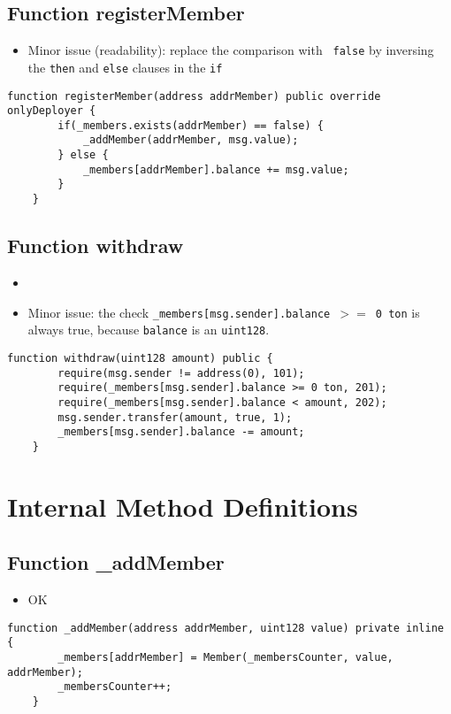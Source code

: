 \subsection{Function registerMember}

\begin{itemize}
\item Minor issue (readability): replace the comparison with {\tt
  false} by inversing the {\tt then} and {\tt else} clauses in the
  {\tt if}
\end{itemize}

\begin{lstlisting}[firstnumber=24]
    function registerMember(address addrMember) public override onlyDeployer {
        if(_members.exists(addrMember) == false) {
            _addMember(addrMember, msg.value);
        } else {
            _members[addrMember].balance += msg.value;
        }
    }
\end{lstlisting}

\subsection{Function withdraw}

\begin{itemize}
\item {}
\item Minor issue: the check {\tt \_members[msg.sender].balance $>=$ 0
  ton} is always true, because {\tt balance} is an {\tt uint128}.
\end{itemize}

\begin{lstlisting}[firstnumber=37]
    function withdraw(uint128 amount) public {
        require(msg.sender != address(0), 101);
        require(_members[msg.sender].balance >= 0 ton, 201);
        require(_members[msg.sender].balance < amount, 202);
        msg.sender.transfer(amount, true, 1);
        _members[msg.sender].balance -= amount;
    }
\end{lstlisting}

\section{Internal Method Definitions}


\subsection{Function \_{}addMember}

\begin{itemize}
\item OK
\end{itemize}

\begin{lstlisting}[firstnumber=32]
    function _addMember(address addrMember, uint128 value) private inline {
        _members[addrMember] = Member(_membersCounter, value, addrMember);
        _membersCounter++;
    }
\end{lstlisting}
